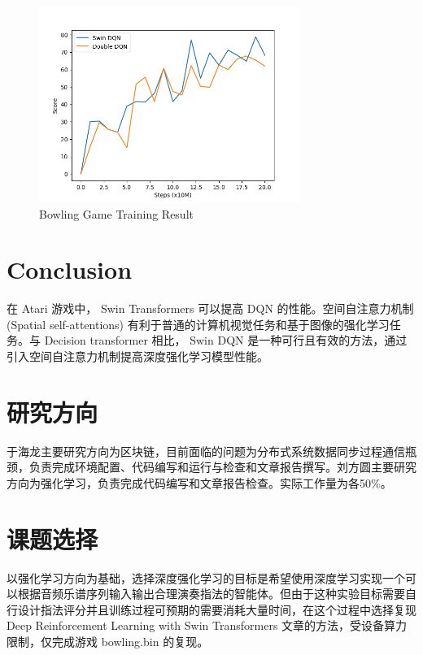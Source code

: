 \documentclass[final,1p,12pt,UTF8,review]{elsarticle}
\begin{document}
\begin{figure}[htp]
    \centerline{\includegraphics[width=8.5cm]{result.png}}
    \caption{Bowling Game Training Result\label{bowling}}
\end{figure}

\section{Conclusion}
在 Atari 游戏中， Swin Transformers 可以提高 DQN 的性能。空间自注意力机制 (Spatial self-attentions) 有利于普通的计算机视觉任务和基于图像的强化学习任务。与 Decision transformer 相比， Swin DQN 是一种可行且有效的方法，通过引入空间自注意力机制提高深度强化学习模型性能。

%  
% 




\newpage
\appendix
\section{研究方向}
于海龙主要研究方向为区块链，目前面临的问题为分布式系统数据同步过程通信瓶颈，负责完成环境配置、代码编写和运行与检查和文章报告撰写。刘方圆主要研究方向为强化学习，负责完成代码编写和文章报告检查。实际工作量为各50\%。
\section{课题选择}
以强化学习方向为基础，选择深度强化学习的目标是希望使用深度学习实现一个可以根据音频乐谱序列输入输出合理演奏指法的智能体。但由于这种实验目标需要自行设计指法评分并且训练过程可预期的需要消耗大量时间，在这个过程中选择复现 Deep Reinforcement Learning with Swin Transformers 文章的方法，受设备算力限制，仅完成游戏 bowling.bin 的复现。
\end{document}
